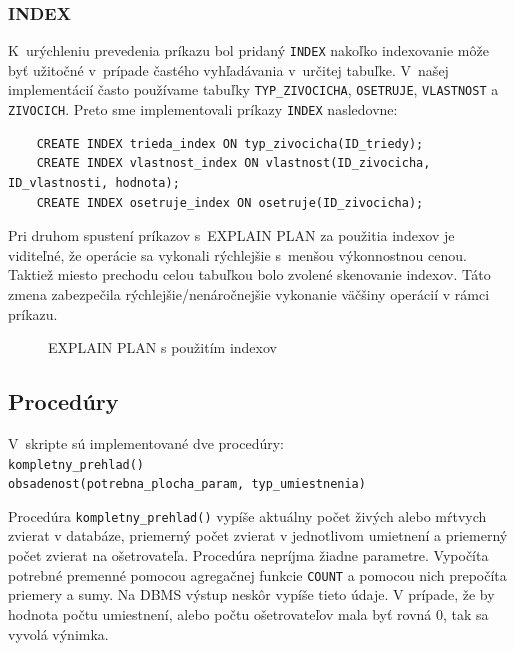 \documentclass[a4paper, 11pt]{article}
\begin{document}
        \subsubsection{INDEX}
         K~urýchleniu prevedenia príkazu bol pridaný \texttt{INDEX} nakoľko indexovanie môže byť užitočné v~prípade častého vyhľadávania v~určitej tabuľke. V~našej implementácií často používame tabuľky \texttt{TYP\_ZIVOCICHA}, \texttt{OSETRUJE}, \texttt{VLASTNOST} a \texttt{ZIVOCICH}.
          Preto sme implementovali príkazy \texttt{INDEX} nasledovne:
    \begin{lstlisting}
    CREATE INDEX trieda_index ON typ_zivocicha(ID_triedy);
    CREATE INDEX vlastnost_index ON vlastnost(ID_zivocicha, ID_vlastnosti, hodnota);
    CREATE INDEX osetruje_index ON osetruje(ID_zivocicha);
    \end{lstlisting}
        Pri druhom spustení príkazov s~EXPLAIN PLAN za použitia indexov je viditeľné, že operácie sa vykonali rýchlejšie s~menšou výkonnostnou cenou. Taktiež miesto prechodu celou tabuľkou bolo zvolené skenovanie indexov. Táto zmena zabezpečila rýchlejšie/nenáročnejšie vykonanie väčšiny operácií v rámci príkazu.
	
	\begin{figure}[h]
		\centering
		\caption{EXPLAIN PLAN s použitím indexov}
	\end{figure}

	\subsection{Procedúry} 
	V~skripte sú implementované dve procedúry:\\
	\texttt{kompletny\_prehlad()}\\
	\texttt{obsadenost(potrebna\_plocha\_param, typ\_umiestnenia)}
	
	Procedúra \texttt{kompletny\_prehlad()} vypíše aktuálny počet živých alebo mŕtvych zvierat v databáze, priemerný počet zvierat v jednotlivom umietnení a priemerný počet zvierat na ošetrovateľa. Procedúra nepríjma žiadne parametre. Vypočíta potrebné premenné pomocou agregačnej funkcie \texttt{COUNT} a pomocou nich prepočíta priemery a sumy. Na DBMS výstup neskôr vypíše tieto údaje. V prípade, že by hodnota počtu umiestnení, alebo počtu ošetrovateľov mala byť rovná 0, tak sa vyvolá výnimka.
	
\end{document}
